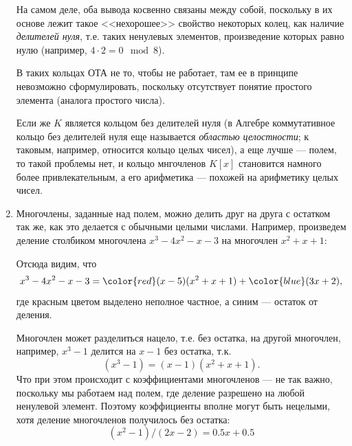 \begin{enumerate}
На самом деле, оба вывода косвенно связаны между собой, поскольку в их основе лежит такое <<нехорошее>> свойство некоторых колец, как наличие \textit{делителей нуля}, т.е. таких ненулевых элементов, произведение которых равно нулю (например, $4\cdot 2=0\mod 8$).

В таких кольцах ОТА не то, чтобы не работает, там ее в принципе невозможно сформулировать, поскольку отсутствует понятие простого элемента (аналога простого числа).

Если же $K$ является кольцом без делителей нуля (в Алгебре коммутативное кольцо без делителей нуля еще называется \textit{областью целостности}; к таковым, например, относится кольцо целых чисел), а еще лучше --- полем, то такой проблемы нет, и кольцо мнгочленов $K[x]$ становится намного более привлекательным, а его арифметика --- похожей на арифметику целых чисел.




\item Многочлены, заданные над полем, можно делить друг на друга с остатком так же, как это делается с обычными целыми числами. Например, произведем деление столбиком многочлена $x^3-4x^2-x-3$ на многочлен $x^2+x+1$:
\begin{center}
\end{center}
Отсюда видим, что
$$
x^3-4x^2-x-3 = {\color{red}(x-5)}(x^2+x+1) + {\color{blue}(3x+2)},
$$
где красным цветом выделено неполное частное, а синим --- остаток от деления.

Многочлен может разделиться нацело, т.е. без остатка, на другой многочлен, например, $x^3-1$ делится на $x-1$ без остатка, т.к.
$$
(x^3-1)=(x-1)(x^2+x+1).
$$
Что при этом происходит с коэффициентами многочленов --- не так важно, поскольку мы работаем над полем, где деление разрешено на любой ненулевой элемент. Поэтому коэффициенты вполне могут быть нецелыми, хотя деление многочленов получилось без остатка:
$$
(x^2-1)/(2x-2) = 0.5x+0.5
$$


\end{enumerate}
